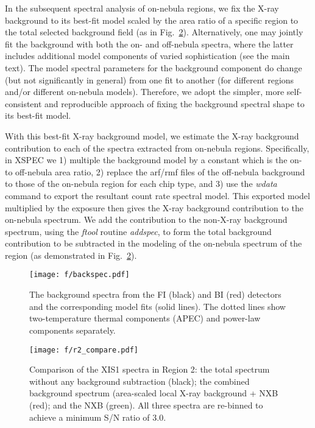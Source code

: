 \documentclass[usenatbib]{mnras}
\begin{document}
In the subsequent spectral analysis of on-nebula regions, we fix the X-ray background to its best-fit model scaled by the area ratio of a specific region to the total selected background field (as in Fig.~\ref{f:compare}). Alternatively, one may jointly fit the background with both the on- and off-nebula spectra, where the latter includes additional model components of varied sophistication (see the main text). The model spectral parameters for the background component do change (but not significantly in general) from one fit to another (for different regions and/or different on-nebula models).
Therefore, we adopt the simpler, more self-consistent and reproducible approach of fixing the background spectral shape to its best-fit model. 

With this best-fit X-ray background model, we estimate the X-ray background contribution to each of the spectra extracted from on-nebula regions. Specifically,  in XSPEC we 1) multiple the background model by a constant which is the on- to off-nebula area ratio, 2) replace the arf/rmf files of the off-nebula background to those of the on-nebula region for each chip type, and 3) use the \textit{wdata} command to export the resultant count rate spectral model. This exported model multiplied by the exposure then gives the X-ray background contribution to the on-nebula spectrum.  We add the contribution to the non-X-ray background spectrum, using the \textit{ftool} routine \textit{addspec}, to form the total background contribution to be subtracted in the modeling of the on-nebula spectrum of the region  (as demonstrated in Fig.~\ref{f:compare}). 

\begin{figure}%
\texttt{[image: f/backspec.pdf]}
\caption{The background spectra from the FI (black) and BI (red) detectors and the corresponding model fits (solid lines). The dotted lines show two-temperature thermal components (APEC) and power-law components separately. }
\label{f:spec-back}
\end{figure}

\begin{figure}%
\texttt{[image: f/r2\_compare.pdf]}
\caption{Comparison of the XIS1 spectra in Region 2: the total spectrum without any background subtraction (black); the combined background spectrum (area-scaled local X-ray background + NXB (red); and the NXB (green). All three spectra are re-binned to achieve a minimum S/N ratio of 3.0.}
\label{f:compare}
\end{figure}
\end{document}
